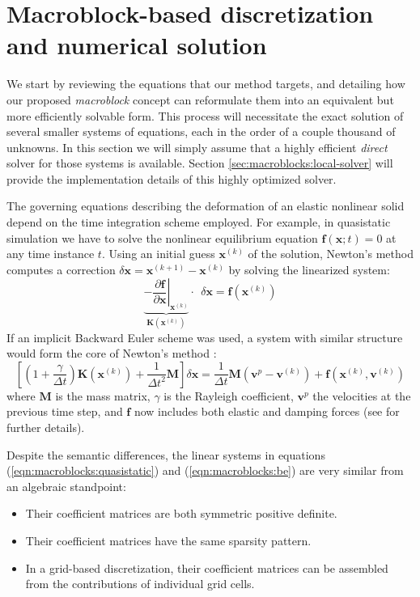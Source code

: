 \section{Macroblock-based discretization and numerical solution}
\label{sec:macroblocks:discretization}

We start by reviewing the equations that our method targets, and
detailing how our proposed \emph{macroblock} concept can reformulate
them into an equivalent but more efficiently solvable form. This
process will necessitate the exact solution of several smaller systems
of equations, each in the order of a couple thousand of unknowns. In
this section we will simply assume that a highly efficient
\emph{direct} solver for those systems is available. Section
\ref{sec:macroblocks:local-solver} will provide the implementation details of this
highly optimized solver.

The governing equations describing the deformation of an elastic
nonlinear solid depend on the time integration scheme employed. For
example, in quasistatic simulation we have to solve the nonlinear
equilibrium equation $\mathbf{f}(\mathbf{x};t)=0$ at any time instance
$t$. Using an initial guess $\mathbf{x}^{(k)}$ of the solution,
Newton's method computes a correction
$\delta\mathbf{x}=\mathbf{x}^{(k+1)}\!\!-\!\mathbf{x}^{(k)}$ by
solving the linearized system:
\begin{equation}
\underbrace{\left.
-\frac{\partial\mathbf{f}}{\partial\mathbf{x}}
\right|_{\mathbf{x}^{(k)}}
}_{\mathbf{K}(\mathbf{x}^{(k)})}
\cdot\ \ 
\delta\mathbf{x}=\mathbf{f}(\mathbf{x}^{(k)})
\label{eqn:macroblocks:quasistatic}
\end{equation}
If an implicit Backward Euler scheme was used, a system with similar
structure would form the core of Newton's method \cite{SifakB:2012}:
\begin{equation}
\left[(1\!\!+\!\!\frac{\gamma}{\Delta t})\mathbf{K}(\mathbf{x}^{(k)})\!+\!\frac{1}{\Delta t^2}\mathbf{M}\right]
\delta\mathbf{x}=\frac{1}{\Delta t}\mathbf{M}(\mathbf{v}^p\!\!-\!\mathbf{v}^{(k)})+\mathbf{f}(\mathbf{x}^{(k)},\mathbf{v}^{(k)})
\label{eqn:macroblocks:be}
\end{equation}
where $\mathbf{M}$ is the mass matrix, $\gamma$ is the Rayleigh
coefficient, $\mathbf{v}^p$ the velocities at the previous time step,
and $\mathbf{f}$ now includes both elastic and damping forces (see
\cite{SifakB:2012} for further details).

Despite the semantic differences, the linear systems in equations
(\ref{eqn:macroblocks:quasistatic}) and (\ref{eqn:macroblocks:be}) are very similar from an
algebraic standpoint:
\begin{itemize}
\item{Their coefficient matrices are both symmetric positive definite.}
\item{Their coefficient matrices have the same sparsity pattern.}
\item{In a grid-based discretization, their coefficient matrices can
    be assembled from the contributions of individual grid cells.}
\end{itemize}

